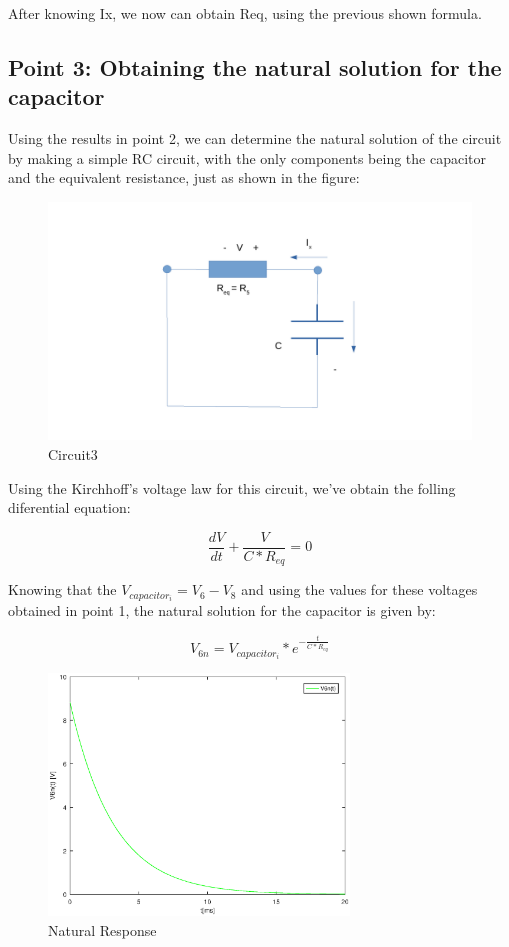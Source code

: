 After knowing Ix, we now can obtain Req, using the previous shown formula.

\subsection{Point 3: Obtaining the natural solution for the capacitor}

Using the results in point 2, we can determine the natural solution of the circuit by making a simple RC circuit, with the only components being the capacitor and the equivalent resistance, just as shown in the figure:

\begin{figure}[H]
\centering
\includegraphics[width = 15cm]{circuit3.pdf}
\caption {Circuit3}
\end{figure}

Using the Kirchhoff's voltage law for this circuit, we've obtain the folling diferential equation:

\begin{equation}
\frac{dV}{dt} + \frac{V}{C*R_{eq}} = 0
\end{equation}

Knowing that the $V_{capacitor_i} = V_{6} - V_{8}$ and using the values for these voltages obtained in point 1, the natural solution for the capacitor is given by:

\begin{equation}
V_{6n} = V_{capacitor_i} * e^{-\frac{t}{C*R_{eq}}}
\end{equation}

\begin{figure}[H]
\centering
\includegraphics[width = 8cm]{NaturalResponse.eps}
\caption {Natural Response}
\end{figure}



